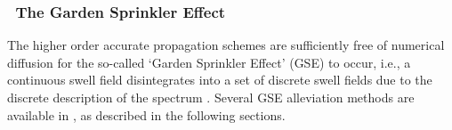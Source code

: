 \vsssub
\subsubsection{~The Garden Sprinkler Effect} \label{sub:num_GSE}
\vsssub

\noindent
The higher order accurate propagation schemes are sufficiently free of
numerical diffusion for the so-called `Garden Sprinkler Effect' (GSE) to
occur, i.e., a continuous swell field disintegrates into a set of discrete
swell fields due to the discrete description of the spectrum
\citep[Fig.~3c]{art:BH87}. Several GSE alleviation methods are available in
\ws, as described in the following sections.
